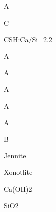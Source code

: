 \documentclass[a4paper,portrait,12pt]{article}
\begin{document}
\begin{flushleft}
A
\end{flushleft}


\begin{flushleft}
C
\end{flushleft}





\begin{flushleft}
CSH:Ca/Si=2.2
\end{flushleft}





\begin{flushleft}
A
\end{flushleft}


\begin{flushleft}
A
\end{flushleft}


\begin{flushleft}
A
\end{flushleft}





\begin{flushleft}
A
\end{flushleft}





\begin{flushleft}
A
\end{flushleft}





\begin{flushleft}
B
\end{flushleft}





\begin{flushleft}
Jennite
\end{flushleft}


\begin{flushleft}
Xonotlite
\end{flushleft}


\begin{flushleft}
Ca(OH)2
\end{flushleft}


\begin{flushleft}
SiO2
\end{flushleft}
\end{document}
